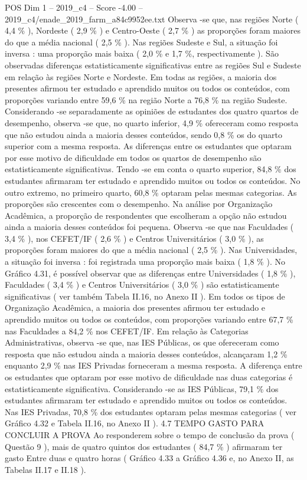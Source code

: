 \begin{textsample}{POS Dim 1 – 2019\_c4 – Score -4.00 – 2019\_c4/enade\_2019\_farm\_a84c9952ee.txt}
Observa -se que, nas regiões Norte ( 4,4 \% ), Nordeste ( 2,9 \% ) e Centro-Oeste ( 2,7 \% ) as proporções foram maiores do que a média nacional ( 2,5 \% ).
Nas regiões Sudeste e Sul, a situação foi inversa : uma proporção mais baixa ( 2,0 \% e 1,7 \%, respectivamente ).
São observadas diferenças estatisticamente significativas entre as regiões Sul e Sudeste em relação às regiões Norte e Nordeste.
Em todas as regiões, a maioria dos presentes afirmou ter estudado e aprendido muitos ou todos os conteúdos, com proporções variando entre 59,6 \% na região Norte a 76,8 \% na região Sudeste.
Considerando -se separadamente as opiniões de estudantes dos quatro quartos de desempenho, observa -se que, no quarto inferior, 4,9 \% ofereceram como resposta que não estudou ainda a maioria desses conteúdos, sendo 0,8 \% os do quarto superior com a mesma resposta.
As diferenças entre os estudantes que optaram por esse motivo de dificuldade em todos os quartos de desempenho são estatisticamente significativas.
Tendo -se em conta o quarto superior, 84,8 \% dos estudantes afirmaram ter estudado e aprendido muitos ou todos os conteúdos.
No outro extremo, no primeiro quarto, 60,8 \% optaram pelas mesmas categorias.
As proporções são crescentes com o desempenho.
Na análise por Organização Acadêmica, a proporção de respondentes que escolheram a opção não estudou ainda a maioria desses conteúdos foi pequena.
Observa -se que nas Faculdades ( 3,4 \% ), nos CEFET/IF ( 2,6 \% ) e Centros Universitários ( 3,0 \% ), as proporções foram maiores do que a média nacional ( 2,5 \% ).
Nas Universidades, a situação foi inversa : foi registrada uma proporção mais baixa ( 1,8 \% ).
No Gráfico 4.31, é possível observar que as diferenças entre Universidades ( 1,8 \% ), Faculdades ( 3,4 \% ) e Centros Universitários ( 3,0 \% ) são estatisticamente significativas ( ver também Tabela II.16, no Anexo II ).
Em todos os tipos de Organização Acadêmica, a maioria dos presentes afirmou ter estudado e aprendido muitos ou todos os conteúdos, com proporções variando entre 67,7 \% nas Faculdades a 84,2 \% nos CEFET/IF.
Em relação às Categorias Administrativas, observa -se que, nas IES Públicas, os que ofereceram como resposta que não estudou ainda a maioria desses conteúdos, alcançaram 1,2 \% enquanto 2,9 \% nas IES Privadas forneceram a mesma resposta.
A diferença entre os estudantes que optaram por esse motivo de dificuldade nas duas categorias é estatisticamente significativa.
Considerando -se as IES Públicas, 79,1 \% dos estudantes afirmaram ter estudado e aprendido muitos ou todos os conteúdos.
Nas IES Privadas, 70,8 \% dos estudantes optaram pelas mesmas categorias ( ver Gráfico 4.32 e Tabela II.16, no Anexo II ). 4.7 TEMPO GASTO PARA CONCLUIR A PROVA Ao responderem sobre o tempo de conclusão da prova ( Questão 9 ), mais de quatro quintos dos estudantes ( 84,7 \% ) afirmaram ter gasto Entre duas e quatro horas ( Gráfico 4.33 a Gráfico 4.36 e, no Anexo II, as Tabelas II.17 e II.18 ).

\end{textsample}
